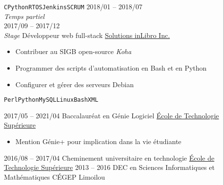 \documentclass[9pt]{developercv} %
\begin{document}
\begin{minipage}[t]{0.8\textwidth}
\begin{entrylist}
{			\texttt{C}\slashsep\texttt{Python}\slashsep\texttt{RTOS}\slashsep\texttt{Jenkins}\slashsep\texttt{SCRUM}
		}
	\entry
		{2018/01 -- 2018/07\\{\small\emph{Temps partiel}}\\2017/09 -- 2017/12\\{\small\emph{Stage}}}
		{Développeur web full-stack}
		{\href{https://inlibro.com/}{Solutions inLibro Inc.}}
		{
			\vspace{-14pt}
			\begin{itemize}
				\renewcommand{\labelitemi}{\raisebox{.45ex}{\rule{.6ex}{.6ex}}}
				\setlength\itemsep{-1pt}
				\item Contribuer au SIGB open-source \emph{Koha}
				\item Programmer des scripts d'automatisation en Bash et en Python
				\item Configurer et gérer des serveurs Debian
			\end{itemize}
			\vspace{-4pt}
			\texttt{Perl}\slashsep\texttt{Python}\slashsep\texttt{MySQL}\slashsep\texttt{Linux}\slashsep\texttt{Bash}\slashsep\texttt{XML}
		}
\end{entrylist}



\begin{entrylist}
	\setlength\itemsep{-1pt}
	\entry
		{2017/05 -- 2021/04}
		{Baccalauréat en Génie Logiciel}
		{\href{https://etsmtl.ca}{École de Technologie Supérieure}}
		{
			\vspace{-14pt}
			\begin{itemize}
				\renewcommand{\labelitemi}{\raisebox{.45ex}{\rule{.6ex}{.6ex}}}
				\setlength\itemsep{-1pt}
				\item Mention Génie+ pour implication dans la vie étudiante
			\end{itemize}
			\vspace{-8pt}
		}
	\entry
		{2016/08 -- 2017/04}
		{Cheminement universitaire en technologie}
		{\href{https://etsmtl.ca}{École de Technologie Supérieure}}
		{\vspace{-14pt}}
	\entry
		{2013 -- 2016}
		{DEC en Sciences Informatiques et Mathématiques}
		{CÉGEP Limoilou}
		{\vspace{-14pt}}
\end{entrylist}


\end{minipage}
\end{document}
